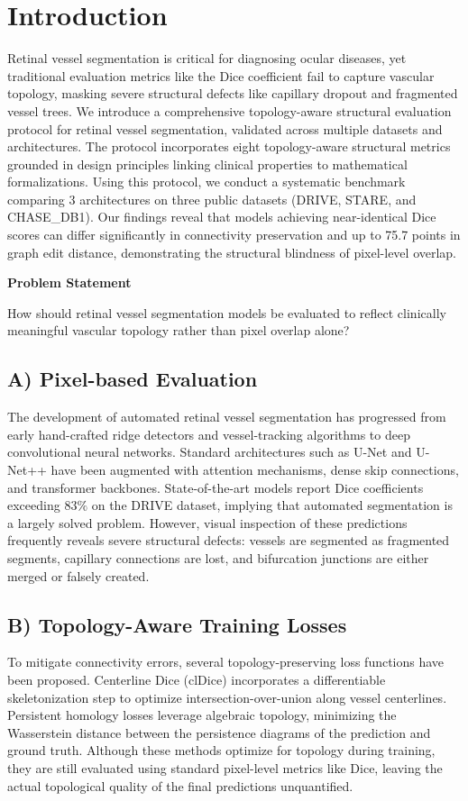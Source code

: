 \documentclass[conference]{IEEEtran}
\begin{document}
\section{Introduction}
Retinal vessel segmentation is critical for diagnosing ocular diseases, yet traditional evaluation metrics like the Dice coefficient fail to capture vascular topology, masking severe structural defects like capillary dropout and fragmented vessel trees. We introduce a comprehensive topology-aware structural evaluation protocol for retinal vessel segmentation, validated across multiple datasets and architectures. The protocol incorporates eight topology-aware structural metrics grounded in design principles linking clinical properties to mathematical formalizations. Using this protocol, we conduct a systematic benchmark comparing 3 architectures on three public datasets (DRIVE, STARE, and CHASE\_DB1). Our findings reveal that models achieving near-identical Dice scores can differ significantly in connectivity preservation and up to 75.7 points in graph edit distance, demonstrating the structural blindness of pixel-level overlap.

\textbf{Problem Statement}

How should retinal vessel segmentation models be evaluated to reflect clinically meaningful vascular topology rather than pixel overlap alone?

\subsection{A) Pixel-based Evaluation}
The development of automated retinal vessel segmentation has progressed from early hand-crafted ridge detectors and vessel-tracking algorithms to deep convolutional neural networks. Standard architectures such as U-Net and U-Net++ have been augmented with attention mechanisms, dense skip connections, and transformer backbones. State-of-the-art models report Dice coefficients exceeding $83\%$ on the DRIVE dataset, implying that automated segmentation is a largely solved problem. However, visual inspection of these predictions frequently reveals severe structural defects: vessels are segmented as fragmented segments, capillary connections are lost, and bifurcation junctions are either merged or falsely created.

\subsection{B) Topology-Aware Training Losses}
To mitigate connectivity errors, several topology-preserving loss functions have been proposed. Centerline Dice (clDice) incorporates a differentiable skeletonization step to optimize intersection-over-union along vessel centerlines. Persistent homology losses leverage algebraic topology, minimizing the Wasserstein distance between the persistence diagrams of the prediction and ground truth. Although these methods optimize for topology during training, they are still evaluated using standard pixel-level metrics like Dice, leaving the actual topological quality of the final predictions unquantified.
\end{document}
